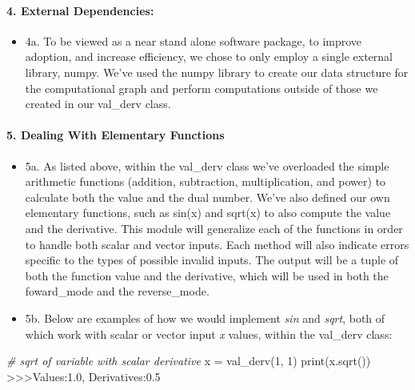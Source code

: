 \documentclass[11pt]{article}
\providecommand{\tightlist}{%
      \setlength{\itemsep}{0pt}\setlength{\parskip}{0pt}}
\newenvironment{Shaded}{}{}
\newcommand{\DecValTok}[1]{\textcolor[rgb]{0.25,0.63,0.44}{{#1}}}
\newcommand{\FloatTok}[1]{\textcolor[rgb]{0.25,0.63,0.44}{{#1}}}
\newcommand{\CommentTok}[1]{\textcolor[rgb]{0.38,0.63,0.69}{\textit{{#1}}}}
\newcommand{\NormalTok}[1]{{#1}}
\newcommand{\OperatorTok}[1]{\textcolor[rgb]{0.40,0.40,0.40}{{#1}}}
\newcommand{\BuiltInTok}[1]{{#1}}
\begin{document}
\hypertarget{external-dependencies}{%
\paragraph{\texorpdfstring{4. \textbf{External
Dependencies:}}{4. External Dependencies:}}\label{external-dependencies}}

\begin{itemize}
\tightlist
\item
  4a. To be viewed as a near stand alone software package, to improve
  adoption, and increase efficiency, we chose to only employ a single
  external library, numpy. We've used the numpy library to create our
  data structure for the computational graph and perform computations
  outside of those we created in our val\_derv class.
\end{itemize}

\hypertarget{dealing-with-elementary-functions}{%
\paragraph{\texorpdfstring{5. \textbf{Dealing With Elementary
Functions}}{5. Dealing With Elementary Functions}}\label{dealing-with-elementary-functions}}

\begin{itemize}
\tightlist
\item
  5a. As listed above, within the val\_derv class we've overloaded the
  simple arithmetic functions (addition, subtraction, multiplication,
  and power) to calculate both the value and the dual number. We've also
  defined our own elementary functions, such as sin(x) and sqrt(x) to
  also compute the value and the derivative. This module will generalize
  each of the functions in order to handle both scalar and vector
  inputs. Each method will also indicate errors specific to the types of
  possible invalid inputs. The output will be a tuple of both the
  function value and the derivative, which will be used in both the
  foward\_mode and the reverse\_mode.\\
\item
  5b. Below are examples of how we would implement \emph{sin} and
  \emph{sqrt}, both of which work with scalar or vector input \emph{x}
  values, within the val\_derv class:
\end{itemize}

\begin{Shaded}
\begin{Highlighting}[]
\CommentTok{# sqrt of variable with scalar derivative}
\NormalTok{x }\OperatorTok{=}\NormalTok{ val_derv(}\DecValTok{1}\NormalTok{, }\DecValTok{1}\NormalTok{)}
\BuiltInTok{print}\NormalTok{(x.sqrt())}
\OperatorTok{>>>}\NormalTok{Values:}\FloatTok{1.0}\NormalTok{, Derivatives:}\FloatTok{0.5}
\end{Highlighting}
\end{Shaded}
\end{document}

